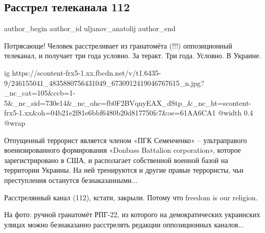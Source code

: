  
 
 
 
 
 
\subsection{Расстрел телеканала 112}
\label{sec:20_10_2021.fb.uljanov_anatolij.1.telekanal_112_rasstrel}
 
\ifcmt
 author_begin
   author_id uljanov_anatolij
 author_end
\fi


Потрясающе! Человек расстреливает из гранатомёта (!!!) оппозиционный телеканал,
и получает три года условно. За теракт. Три года. Условно. В Украине.

\ifcmt
  ig https://scontent-frx5-1.xx.fbcdn.net/v/t1.6435-9/246155041_4835880756431049_6730912419046767615_n.jpg?_nc_cat=105&ccb=1-5&_nc_sid=730e14&_nc_ohc=fb0F2BVqnyEAX_dStp_&_nc_ht=scontent-frx5-1.xx&oh=04b21e2f81e6bbf6480b20d817750fc7&oe=61AA6CA1
  @width 0.4
  @wrap 
\fi

Отпущенный террорист является членом «ПГК Семенченко» – ультраправого
военизированного формирования «Donbass Battalion corporation», которое
зарегистрировано в США, и располагает собственной военной базой на территории
Украины. На ней тренируются и другие правые террористы, чьи преступления
останутся безнаказанными...

Расстрелянный канал (112), кстати, закрыли. Потому что freedom is our religion.

На фото: ручной гранатомёт РПГ-22, из которого на демократических украинских
улицах можно безнаказанно расстрелять редакции оппозиционных каналов...

